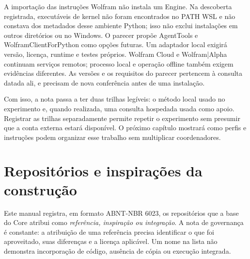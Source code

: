 \begin{limite}
A importação das instruções Wolfram não instala um Engine. Na descoberta
registrada, executáveis de kernel não foram encontrados no PATH WSL e
 não constava dos metadados desse ambiente Python; isso não
exclui instalações em outros diretórios ou no Windows. O parecer
 propõe AgentTools e
WolframClientForPython como opções futuras. Um adaptador local exigirá versão,
licença, runtime e testes próprios. Wolfram Cloud e Wolfram|Alpha continuam
serviços remotos; processo local e operação offline também exigem evidências
diferentes. As versões e os requisitos do parecer pertencem à consulta datada
ali, e precisam de nova conferência antes de uma instalação.
\end{limite}

\begin{descricao}
Com isso, a nota passa a ter duas trilhas legíveis: o método local usado no
experimento e, quando realizada, uma consulta hospedada usada como apoio.
Registrar as trilhas separadamente permite repetir o experimento sem presumir
que a conta externa estará disponível. O próximo capítulo mostrará como
perfis e instruções podem organizar esse trabalho sem multiplicar coordenadores.
\end{descricao}

\section{Repositórios e inspirações da construção}


\begin{descricao}
Este manual registra, em formato ABNT-NBR 6023, os repositórios que a base do Core
atribui como \emph{referência, inspiração ou integração}. A nota de governança é
constante: a atribuição de uma referência precisa identificar o que foi
aproveitado, suas diferenças e a licença aplicável. Um nome na lista não
demonstra incorporação de código, ausência de cópia ou execução integrada.
\end{descricao}

